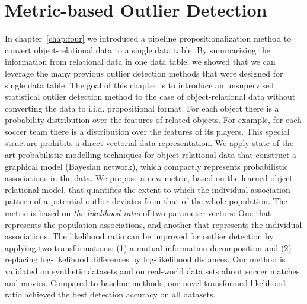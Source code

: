
\chapter{Metric-based Outlier Detection}
\label{chap:five}

In chapter~\ref{chap:four} we introduced a pipeline propositionalization method to convert object-relational data to a single data table. By summarizing the information from relational data in one data table, we showed that we can leverage the many previous outlier detection methods that were designed for single data table. The goal of this chapter is to introduce an unsupervised 
statistical outlier detection method  to the case of object-relational data without converting the data
to i.i.d. propositional format.
For each object there is a probability distribution over the features of related objects. For example, for each soccer team there is a distribution over the features of its players.
This special structure prohibits a direct vectorial data representation. We apply state-of-the-art probabilistic modelling techniques for object-relational data that construct a graphical model (Bayesian network), which compactly represents probabilistic associations in the data. We propose a new  metric, based on the learned object-relational model, that quantifies the extent to which the individual association pattern of a potential outlier deviates from that of the whole population. The metric is based on {\em the likelihood ratio} of two parameter vectors: One that represents the population associations, and another that represents the individual associations. 
The likelihood ratio can be improved for outlier detection by applying two transformations: (1) a mutual information decomposition and (2) replacing log-likelihood differences by log-likelihood distances. 
Our method is validated on synthetic datasets and on real-world data sets about soccer matches and movies. Compared to baseline methods, our novel transformed likelihood ratio achieved the best detection accuracy 
on all datasets. 
